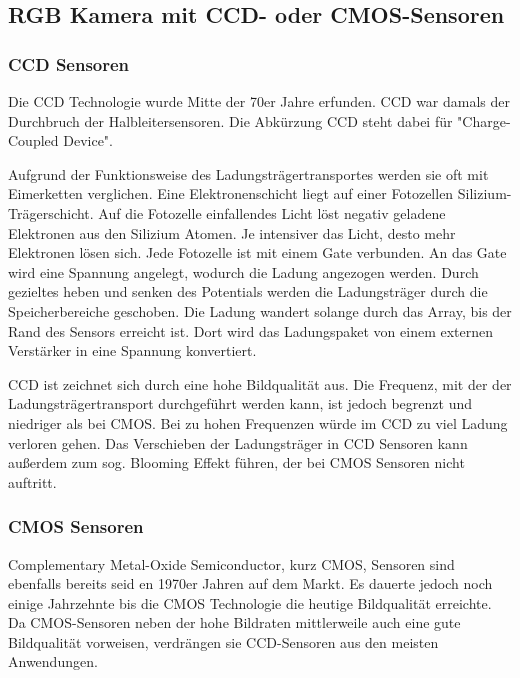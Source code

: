   \subsection{RGB Kamera mit CCD- oder CMOS-Sensoren}

  \subsubsection{CCD Sensoren}
  Die CCD Technologie wurde Mitte der 70er Jahre erfunden. CCD war damals der Durchbruch der Halbleitersensoren. Die Abkürzung CCD steht dabei für "Charge-Coupled Device".
  \newline
  
  Aufgrund der Funktionsweise des Ladungsträgertransportes werden sie oft mit Eimerketten verglichen. Eine Elektronenschicht liegt auf einer Fotozellen Silizium-Trägerschicht. Auf die Fotozelle einfallendes Licht löst negativ geladene Elektronen aus den Silizium Atomen. Je intensiver das Licht, desto mehr Elektronen lösen sich. Jede Fotozelle ist mit einem Gate verbunden. An das Gate wird eine Spannung angelegt, wodurch die Ladung angezogen werden. Durch gezieltes heben und senken des Potentials werden die Ladungsträger durch die Speicherbereiche geschoben. Die Ladung wandert solange durch das Array, bis der Rand des Sensors erreicht ist. Dort wird das Ladungspaket von einem externen Verstärker in eine Spannung konvertiert.


  CCD ist zeichnet sich durch eine hohe Bildqualität aus. Die Frequenz, mit der der Ladungsträgertransport durchgeführt werden kann, ist jedoch begrenzt und niedriger als bei CMOS. Bei zu hohen Frequenzen würde im CCD zu viel Ladung verloren gehen.
  Das Verschieben der Ladungsträger in CCD Sensoren kann au{\ss}erdem zum sog. Blooming Effekt führen, der bei CMOS Sensoren nicht auftritt.

  \subsubsection{CMOS Sensoren}

  Complementary Metal-Oxide Semiconductor, kurz CMOS, Sensoren sind ebenfalls bereits seid en 1970er Jahren auf dem Markt. Es dauerte jedoch noch einige Jahrzehnte bis die CMOS Technologie die heutige Bildqualität erreichte. Da CMOS-Sensoren neben der hohe Bildraten mittlerweile auch eine gute Bildqualität vorweisen, verdrängen sie CCD-Sensoren aus den meisten Anwendungen. 
  \newline


